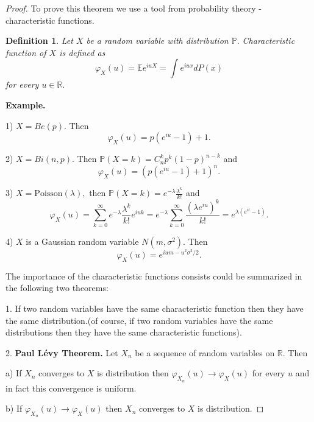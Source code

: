 \documentclass[reqno,psamsfonts, 10pt]{amsart}
\newtheorem{definition}[thm]{Definition}
\theoremstyle{remark}
\begin{document}
\begin{proof}
To prove this theorem we use a tool from probability theory
- characteristic functions.
\begin{definition}
Let $X$ be a random variable with distribution
$\mathbb{P}.$ Characteristic function of $X$ is defined as
\begin{equation}
\varphi_X(u) = \mathbb{E}e^{i u X} = \int e^{iux} dP(x)
\end{equation}
for every $u \in \mathbb{R}.$
\end{definition}

\textbf{Example.}

1) $X = Be(p).$ Then
\begin{equation}
\varphi_X(u) = p(e^{iu} - 1) + 1.
\end{equation}

2) $X = Bi(n,p).$ Then $\mathbb{P}(X=k) = C_n^k
p^k(1-p)^{n-k}$ and
\begin{equation}
\varphi_X(u) = (p(e^{iu} - 1) + 1)^n.
\end{equation}

3) $X = \mbox{Poisson}(\lambda),$ then $\mathbb{P}(X = k) =
e^{-\lambda} \frac{\lambda^k}{k!}$ and
\begin{equation}
\varphi_X(u) = \sum \limits_{k=0}^\infty e^{-\lambda}
\frac{\lambda^k}{k!} e^{i u k} = e^{-\lambda} \sum
\limits_{k=0}^{\infty} \frac{(\lambda e^{iu})^k }{k!} =
e^{\lambda(e^{it} - 1)}.
\end{equation}

4) $X$ is a Gaussian random variable $N(m,\sigma^2).$ Then
\begin{equation}
\varphi_X(u) = e^{iu m - u^2 \sigma^2/2}.
\end{equation}


The importance of the characteristic functions consists
could be summarized in the following two theorems:

1. If two random variables have the same characteristic
function then they have the same distribution.(of course,
if two random variables have the same distributions then
they have the same characteristic functions).

2. \textbf{Paul L\'{e}vy Theorem.} Let $X_n$ be a sequence
of random variables on $\mathbb{R}.$ Then

a) If $X_n$ converges to $X$ is distribution then
$\varphi_{X_n}(u) \to \varphi_X(u)$ for every $u$ and in
fact this convergence is uniform.

b) If $\varphi_{X_n}(u) \to \varphi_X(u)$ then $X_n$
converges to $X$ is distribution.


\end{proof}
\end{document}

